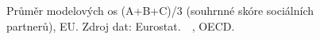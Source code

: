 \def\strPracticalTernaryStrengthMapTitle{Souhrnné skóre sociálních partner\r{u}}%
\def\strPracticalTernaryStrengthMapColorbarLabel{skóre [1]}%
\def\strPracticalTernaryStrengthMapCaption{Průměr modelových os (A+B+C)/3 (souhrnné skóre sociálních partnerů), \acs{EU}. Zdroj dat: Eurostat.~\cite{eurostat_jvs_a_r21}~\cite{eurostat_lc_lci_lev}, \acs{OECD}.~\cite{oecd_cts_cit}}%
%
\begin{figure}[H]
  \centering
  \resizebox{\linewidth}{!}{}
  \caption{\strPracticalTernaryStrengthMapCaption}
  \label{fig:practical_ternary_strength_map}
\end{figure}
